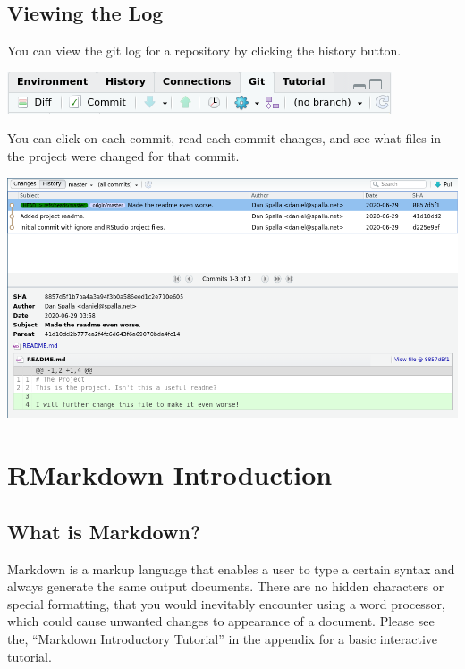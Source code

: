 \documentclass[
]{book}
\begin{document}
\hypertarget{viewing-the-log}{%
\section{Viewing the Log}\label{viewing-the-log}}

You can view the git log for a repository by clicking the history button.

\includegraphics{images/02-commit_1.png}

You can click on each commit, read each commit changes, and see what files in the project were changed for that commit.

\includegraphics{images/02-log_1.png}

\hypertarget{rmarkdown-introduction}{%
\chapter{RMarkdown Introduction}\label{rmarkdown-introduction}}

\hypertarget{what-is-markdown}{%
\section{What is Markdown?}\label{what-is-markdown}}

Markdown is a markup language that enables a user to type a certain syntax and always generate the same output documents. There are no hidden characters or special formatting, that you would inevitably encounter using a word processor, which could cause unwanted changes to appearance of a document. Please see the, ``Markdown Introductory Tutorial'' in the appendix for a basic interactive tutorial.
\end{document}
